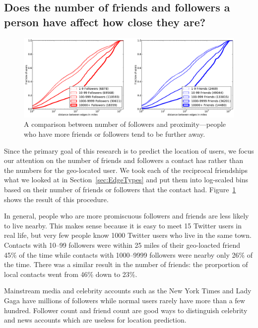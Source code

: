 \subsection{Does the number of friends and followers a person have affect how
close they are?}

\begin{figure}[tb]
\centering
\includegraphics[width=\linewidth]{figures/edge_counts.pdf}
\caption{
A comparison between number of followers and proximity---people who have more
friends or followers tend to be further away.
}
\label{fig:EdgeCounts}
\end{figure}

Since the primary goal of this research is to predict the location of users, we
focus our attention on the number of friends and followers a contact has rather
than the numbers for the geo-located user.
%
We took each of the reciprocal friendships what we looked at in
Section~\ref{sec:EdgeTypes} and put them into log-scaled bins based on their
number of friends or followers that the contact had.
%
Figure~\ref{fig:EdgeCounts} shows the result of this procedure.

In general, people who are more promiscuous followers and friends are less
likely to live nearby.
%
This makes sense because it is easy to meet 15 Twitter users in real life, but
very few people know 1000 Twitter users who live in the same town.
%
Contacts with 10--99 followers were within 25 miles of their geo-loacted friend
45\% of the time while contacts with 1000--9999 followers were nearby only 26\%
of the time.
%
There was a similar result in the number of friends: the prorportion of local
contacts went from 46\% down to 23\%.

Mainstream media and celebrity accounts such as the New York Times and Lady
Gaga have millions of followers while normal users rarely have more than a few
hundred.
%
Follower count and friend count are good ways to distinguish celebrity and news
accounts which are useless for location prediction.

